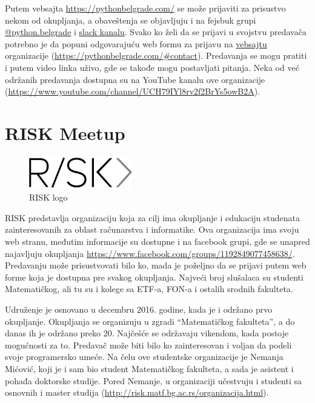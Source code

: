 \documentclass[a4paper]{article}
\begin{document}
{Putem vebsajta \url{https://pythonbelgrade.com/} se može prijaviti za prisustvo nekom od okupljanja, a obaveštenja se objavljuju i na fejsbuk grupi \href{https://www.facebook.com/python.belgrade/}{@python.belgrade} i \href{https://pythonbelgrade.slack.com/join/shared_invite/enQtNTM0OTI4NzY3NDI2LTk2OThkNjQ2YmM5NWNkNTBjMjU3NDY0NjcyNDFiYmZmNjQ4MDE3NjczYWM0NTk1YWVlYzlhNGIwYjU3NjA3Y2Y}{slack kanalu}. Svako ko želi da se prijavi u svojstvu predavača potrebno je da popuni odgovarajuću web formu za prijavu na \href{https://pythonbelgrade.com/}{vebsajtu} organizacije (\url{https://pythonbelgrade.com/#contact}). Predavanja se mogu pratiti i putem video linka uživo, gde se takođe mogu postavljati pitanja. Neka od već održanih predavanja dostupna su na YouTube kanalu ove organizacije (\url{https://www.youtube.com/channel/UCH79IYl8rv2f2BrYs5owB2A}).


\section{RISK Meetup}
\label{sec:riskmatf}

\begin{figure}[h!]
  \centering
  \includegraphics[width=0.4\textwidth]{riskmatf.png}
  \caption{RISK logo}
\end{figure}

RISK predstavlja organizaciju koja za cilj ima okupljanje i edukaciju studenata zainteresovanih za oblast računarstva i informatike. \cite{aboutRisk}
Ova organizacija ima svoju web stranu, međutim informacije su dostupne i na facebook grupi, gde se unapred najavljuju okupljanja \url{https://www.facebook.com/groups/1192849077458638/}. Predavanju može prisustvovati bilo ko, mada je poželjno da se prijavi putem web forme koja je dostupna pre svakog okupljanja. Najveći broj slušalaca su
studenti Matematičkog, ali tu su i kolege sa ETF-a, FON-a i ostalih srodnih fakulteta.

Udruženje je osnovano u decembru 2016. godine, kada je i održano prvo okupljanje. Okupljanja se organizuju u zgradi ``Matematičkog fakulteta'', a do danas ih je održano preko 20. Najčešće se održavaju vikendom, kada postoje mogućnosti za to. Predavač može biti bilo ko zainteresovan i voljan da podeli svoje programersko umeće. Na čelu ove studentske organizacije je Nemanja Mićović, koji je i sam bio student Matematičkog fakulteta, a sada je asistent i pohađa doktorske studije. Pored Nemanje, u organizaciji učestvuju i studenti sa osnovnih i master studija (\url{http://risk.matf.bg.ac.rs/organizacija.html}).

}
\end{document}
